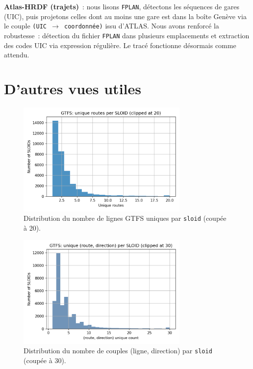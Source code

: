 \textbf{Atlas-HRDF (trajets)} : nous lisons \texttt{FPLAN}, détectons les séquences de gares (UIC), puis projetons celles dont au moins une gare est dans la boîte Genève via le couple \texttt{(UIC $\rightarrow$ coordonnée)} issu d'ATLAS. Nous avons renforcé la robustesse : détection du fichier \texttt{FPLAN} dans plusieurs emplacements et extraction des codes UIC via expression régulière. Le tracé fonctionne désormais comme attendu.

\section{D'autres vues utiles}
\begin{figure}[H]
  \centering
  \includegraphics[width=0.75\textwidth]{../figures/chap4/hist_gtfs_routes_per_sloid.png}
  \caption{Distribution du nombre de lignes GTFS uniques par \texttt{sloid} (coupée à 20).}
\end{figure}

\begin{figure}[H]
  \centering
  \includegraphics[width=0.75\textwidth]{../figures/chap4/hist_gtfs_route_dir_per_sloid.png}
  \caption{Distribution du nombre de couples (ligne, direction) par \texttt{sloid} (coupée à 30).}
\end{figure}

